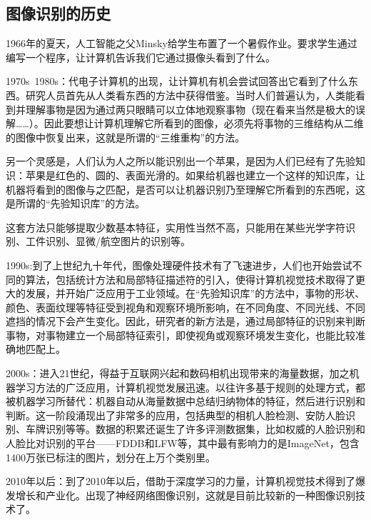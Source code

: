 \documentclass{article}
\begin{document}
\subsection{图像识别的历史}
1966年的夏天，人工智能之父Minsky给学生布置了一个暑假作业。要求学生通过编写一个程序，让计算机告诉我们它通过摄像头看到了什么。\par 
1970s~1980s：代电子计算机的出现，让计算机有机会尝试回答出它看到了什么东西。研究人员首先从人类看东西的方法中获得借鉴。当时人们普遍认为，人类能看到并理解事物是因为通过两只眼睛可以立体地观察事物（现在看来当然是极大的误解……）。因此要想让计算机理解它所看到的图像，必须先将事物的三维结构从二维的图像中恢复出来，这就是所谓的“三维重构”的方法。\par 
另一个灵感是，人们认为人之所以能识别出一个苹果，是因为人们已经有了先验知识：苹果是红色的、圆的、表面光滑的。如果给机器也建立一个这样的知识库，让机器将看到的图像与之匹配，是否可以让机器识别乃至理解它所看到的东西呢，这是所谓的“先验知识库”的方法。\par 
这套方法只能够提取少数基本特征，实用性当然不高，只能用在某些光学字符识别、工件识别、显微/航空图片的识别等。\par 
1990s:到了上世纪九十年代，图像处理硬件技术有了飞速进步，人们也开始尝试不同的算法，包括统计方法和局部特征描述符的引入，使得计算机视觉技术取得了更大的发展，并开始广泛应用于工业领域。在“先验知识库”的方法中，事物的形状、颜色、表面纹理等特征受到视角和观察环境所影响，在不同角度、不同光线、不同遮挡的情况下会产生变化。因此，研究者的新方法是，通过局部特征的识别来判断事物，对事物建立一个局部特征索引，即使视角或观察环境发生变化，也能比较准确地匹配上。\par 
2000s：进入21世纪，得益于互联网兴起和数码相机出现带来的海量数据，加之机器学习方法的广泛应用，计算机视觉发展迅速。以往许多基于规则的处理方式，都被机器学习所替代：机器自动从海量数据中总结归纳物体的特征，然后进行识别和判断。这一阶段涌现出了非常多的应用，包括典型的相机人脸检测、安防人脸识别、车牌识别等等。数据的积累还诞生了许多评测数据集，比如权威的人脸识别和人脸比对识别的平台——FDDB和LFW等，其中最有影响力的是ImageNet，包含1400万张已标注的图片，划分在上万个类别里。\par 
2010年以后：到了2010年以后，借助于深度学习的力量，计算机视觉技术得到了爆发增长和产业化。出现了神经网络图像识别，这就是目前比较新的一种图像识别技术了。\par 
\end{document}
